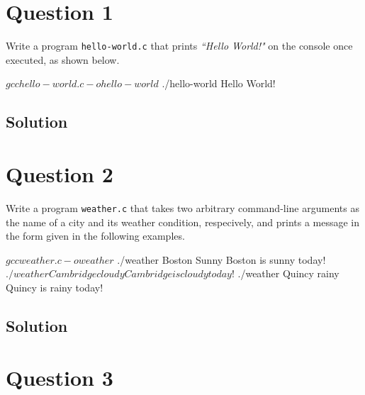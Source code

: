 \documentclass[12pt,letterpaper,twoside]{article}
\begin{document}


\section*{Question 1}

Write a program \texttt{hello-world.c} that prints \textit{``Hello World!"} on the console once executed, as shown below.

\begin{terminal}
$ gcc hello-world.c -o hello-world
$ ./hello-world
Hello World!
\end{terminal}

\subsection*{Solution}

\lstset{language=c,tabsize=4}


\newpage

\section*{Question 2}

Write a program \texttt{weather.c} that takes two arbitrary command-line arguments as the name of a city and its weather condition, respecively, and prints a message in the form given in the following examples.

\begin{terminal}
$ gcc weather.c -o weather
$ ./weather Boston Sunny
Boston is sunny today!
$ ./weather Cambridge cloudy
Cambridge is cloudy today!
$ ./weather Quincy rainy
Quincy is rainy today!
\end{terminal}

\subsection*{Solution}

\lstset{language=c,tabsize=4}


\newpage

\section*{Question 3}
\end{document}
